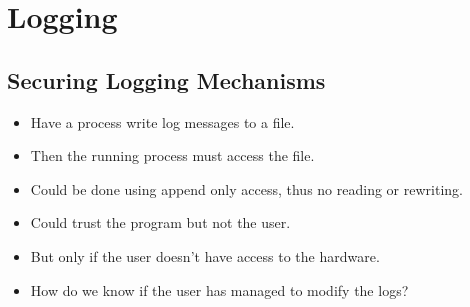 \mode*




\section{Logging}

\subsection{Securing Logging Mechanisms}

\begin{frame}
  \begin{example}
    \begin{itemize}
      \item Have a process write log messages to a file.
    \end{itemize}
  \end{example}

  \pause

  \begin{remark}
    \begin{itemize}
      \item Then the running process must access the file.
    \end{itemize}
  \end{remark}
\end{frame}

\begin{frame}
  \begin{solution}
    \begin{itemize}
      \item Could be done using append only access, thus no reading or 
        rewriting.
      \item Could trust the program but not the user.
      \item But only if the user doesn't have access to the hardware.
    \end{itemize}
  \end{solution}

  \pause

  \begin{question}
    \begin{itemize}
      \item How do we know if the user has managed to modify the logs?
    \end{itemize}
  \end{question}
\end{frame}

